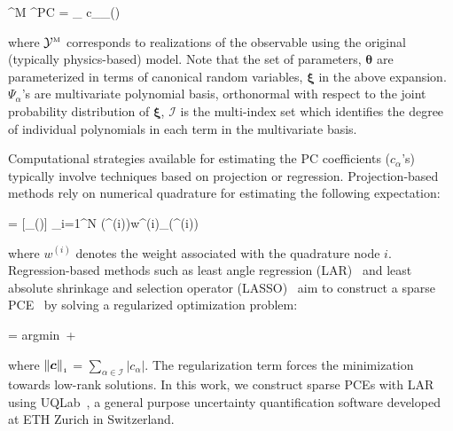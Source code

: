 \be
{}^{\mbox{\tiny M}} \approx {}^{\mbox{\tiny PC}} = 
\sum_{\alpha\in{}} c_{\alpha}\Psi_{\alpha}(\bm{\xi(\theta)}) 
\ee

\noindent where $\mathcal{Y}^{\mbox{\tiny M}}$ corresponds to realizations of the
observable using the original (typically physics-based) model. 
Note that the set of parameters, $\bm{\theta}$ are parameterized in terms of canonical random
variables, $\bm{\xi}$ in the above expansion. $\Psi_{\alpha}$'s are multivariate polynomial
basis, orthonormal with respect to the joint probability distribution of $\bm{\xi}$, $\mathcal{I}$
is the multi-index set which identifies the degree of individual polynomials in each term in the
multivariate basis.

Computational strategies available for estimating the PC coefficients ($c_\alpha$'s) typically involve
techniques based on projection or regression. Projection-based methods rely on numerical
quadrature for estimating the following expectation:

\be
{} = [\Psi_\alpha(\bm{\xi})\cdot{}]
\approx
\sum_{i=1}^{N} (\bm{\theta}^{(i)})w^{(i)}\Psi_\alpha(\bm{\xi}^{(i)})
\ee

\noindent where $w^{(i)}$ denotes the weight associated with the quadrature node $i$. 
Regression-based methods such as least angle regression (LAR)~\cite{Efron:2004} and least absolute shrinkage
and selection operator (LASSO)~\cite{Tibshirani:1996} aim to construct a sparse PCE~\cite{Blatman:2008}
by solving a regularized optimization problem:

\be
{} = \mbox{argmin}~  + \lambda{}
\ee

\noindent where $\left\| {\bm{c}} \right\|_{\scriptscriptstyle 1}$ = $\sum_{\alpha\in \mathcal{I}} |c_\alpha |$.
The regularization term forces the minimization towards low-rank solutions.
In this work, we construct sparse PCEs with LAR using UQLab~\cite{Marelli:2014},
a general purpose uncertainty quantification software developed at ETH Zurich in Switzerland.



















